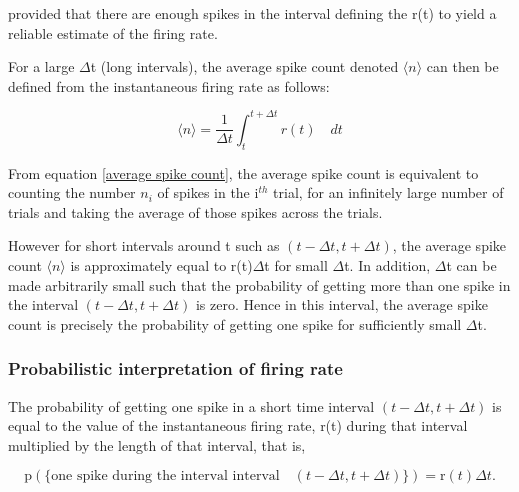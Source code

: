 provided that there are enough spikes in the interval defining the r(t)
to yield a reliable estimate of the firing rate.

For a large $\Delta$t (long intervals), the average spike count denoted $\langle n  \rangle$ can then be  defined from the instantaneous firing rate as follows:

\begin{equation}\label{average spike count}
\langle n \rangle =  \displaystyle  \frac{1}{\Delta t}  
\int_{t}^{t+\Delta t}  r(t)  \quad dt 
\end{equation}

From equation \eqref{average spike count}, the average spike count is equivalent
to counting the number $n_{i}$  of spikes in the i$^{th}$ trial, for an infinitely large number of trials and taking the average of those spikes across the trials.


However for short intervals around t such as $(t-\Delta t, t+\Delta t)$, the average spike count    $\langle n \rangle$ is approximately equal 
to r(t)$\Delta$t for small $\Delta$t.
In addition, $\Delta$t can be made arbitrarily small such that
the probability of getting more than one spike in the interval
 $(t-\Delta t, t+\Delta t)$ is zero. 
Hence in this interval, the average spike count is precisely the probability of getting one spike for sufficiently small $\Delta$t.


\subsubsection{Probabilistic interpretation of firing rate}
The probability of getting one spike in a short time interval  $(t-\Delta t, t+\Delta t)$ is equal to the value of the instantaneous firing rate, r(t) during that interval multiplied by the length of that interval, that is,

\[ 
\displaystyle  \text{p}(\{ \text{one spike during the interval interval} \quad  (t-\Delta t, t+\Delta t)  \}) = \text{r}(t)\Delta t. 
\]

